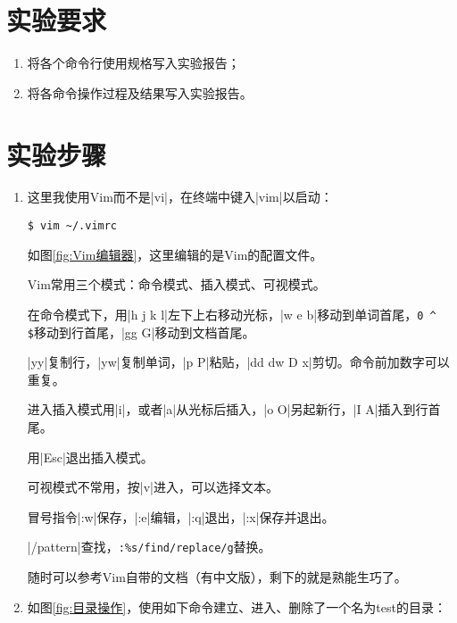 \documentclass[cs4size,a4paper,nofonts]{ctexart}
\begin{document}
\section{实验要求}
\begin{enumerate}
\item 将各个命令行使用规格写入实验报告；
\item 将各命令操作过程及结果写入实验报告。
\end{enumerate}

\section{实验步骤}

\begin{enumerate}[label={(\arabic*)}]

\item 这里我使用Vim而不是|vi|，在终端中键入|vim|以启动：

\begin{Verbatim}
$ vim ~/.vimrc
\end{Verbatim}

\begin{figure}[htp]
\end{figure}

如图\ref{fig:Vim编辑器}，这里编辑的是Vim的配置文件。

Vim常用三个模式：命令模式、插入模式、可视模式。

在命令模式下，用|h j k l|左下上右移动光标，|w e b|移动到单词首尾，\verb+0 ^ $+移动到行首尾，|gg G|移动到文档首尾。

|yy|复制行，|yw|复制单词，|p P|粘贴，|dd dw D x|剪切。命令前加数字可以重复。

进入插入模式用|i|，或者|a|从光标后插入，|o O|另起新行，|I A|插入到行首尾。

用|Esc|退出插入模式。

可视模式不常用，按|v|进入，可以选择文本。

冒号指令|:w|保存，|:e|编辑，|:q|退出，|:x|保存并退出。

|/pattern|查找，\verb+:%s/find/replace/g+替换。

随时可以参考Vim自带的文档（有中文版），剩下的就是熟能生巧了。

\begin{figure}[htp]
\end{figure}

\clearpage

\item 如图\ref{fig:目录操作}，使用如下命令建立、进入、删除了一个名为test的目录：


\end{enumerate}
\end{document}
